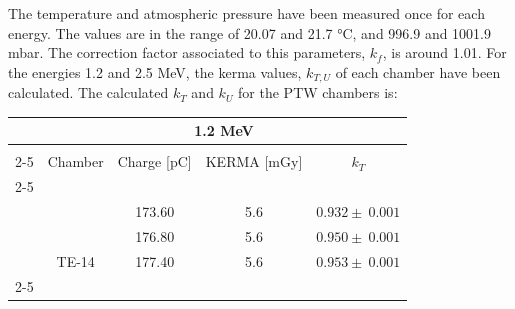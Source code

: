 The temperature and atmospheric pressure have been measured once for each energy. The values are in the range of 20.07 and 21.7 \unit{\celsius}, and 996.9 and 1001.9 \unit{\milli\bar}. The correction factor associated to this parameters, $k_f$, is around 1.01.
For the energies 1.2 and 2.5 \unit{\mega\electronvolt}, the kerma values, $k_{T,U}$ of each chamber have been calculated. The calculated $k_T$ and $k_U$ for the PTW chambers is:
\begin{table}[!h]
\centering
\begin{tabular}{ccccc}
\hline
\rowcolor[HTML]{FCE0A7} 
\multicolumn{1}{|c}{\cellcolor[HTML]{FCE0A7}}                       & \multicolumn{4}{c|}{\cellcolor[HTML]{FCE0A7}1.2 \unit{\mega\electronvolt}}                                                                                                                  \\ \hline
                                                                    &                                 &                                         &                                         &                                                 \\ \cline{2-5} 
\multicolumn{1}{c|}{}                                               & \cellcolor[HTML]{D9D9D9}Chamber & \cellcolor[HTML]{D9D9D9}Charge {[}\unit{\pico\coulomb}{]} & \cellcolor[HTML]{D9D9D9}KERMA {[}\unit{\milli\gray}{]} & \multicolumn{1}{c|}{\cellcolor[HTML]{D9D9D9}$k_T$} \\ \cline{2-5} 
                                                                    &                                 &                                         &                                         &                                                 \\ \hline
\multicolumn{1}{|c|}{\cellcolor[HTML]{FEEFD1}}                      &                                 & 173.60                                  & 5.6                                     & \multicolumn{1}{c|}{$0.932 \pm \:0.001$}                      \\
\multicolumn{1}{|c|}{\cellcolor[HTML]{FEEFD1}}                      &                                 & 176.80                                  & 5.6                                     & \multicolumn{1}{c|}{$0.950 \pm \:0.001$}                      \\
\multicolumn{1}{|c|}{\cellcolor[HTML]{FEEFD1}}                      & \multirow{-3}{*}{TE-14}         & 177.40                                  & 5.6                                     & \multicolumn{1}{c|}{$0.953 \pm \:0.001$}                      \\ \cline{2-5} 

\end{tabular}
\end{table}
